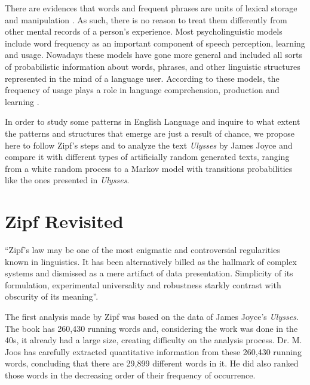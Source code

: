 There are evidences that words and frequent 
phrases are units of lexical storage and manipulation \citep{bybee2007frequency}. 
As such, there is no reason to treat them
differently from other mental records of a person's experience.
Most psycholinguistic models include word frequency as an important component of speech perception,
learning and usage. Nowadays these models have gone more general and included all sorts of probabilistic
information about words, phrases, and other linguistic structures represented in the mind of a language
user. According to these models, the frequency of usage plays a role in language comprehension, production
and learning \citep{jurafsky1996,MacDonald1993,Gregory99theeffects,Brent1996}.
 
In order to study some patterns in English Language and inquire to what extent the
patterns and structures that emerge are just a result of chance, we propose here
to follow Zipf's steps and to analyze the text \textit{Ulysses} by James Joyce and
compare it with different types of artificially random generated texts, ranging from
a white random process to a Markov model with transitions probabilities like the
ones presented in \textit{Ulysses}.
 
 
 
 
\section{Zipf Revisited}
\label{sec:zipf_revisited}
``Zipf's law may be one of the most enigmatic and controversial regularities known
in linguistics. It has been alternatively billed as the hallmark of complex systems and
dismissed as a mere artifact of data presentation. Simplicity of its formulation, experimental
universality and robustness starkly contrast with obscurity of its meaning''\citep{manin2008}.

The first analysis made by Zipf was based on the data of James Joyce's \textit{Ulysses}.
The book has 260,430 running words and, considering the work was done in the 40s, 
it already had a large size, creating difficulty on the analysis process.
Dr. M. Joos has carefully extracted quantitative information from these 260,430 running words,
concluding that there are 29,899 different words in it. He did also ranked those words in the
decreasing order of their frequency of occurrence. 

